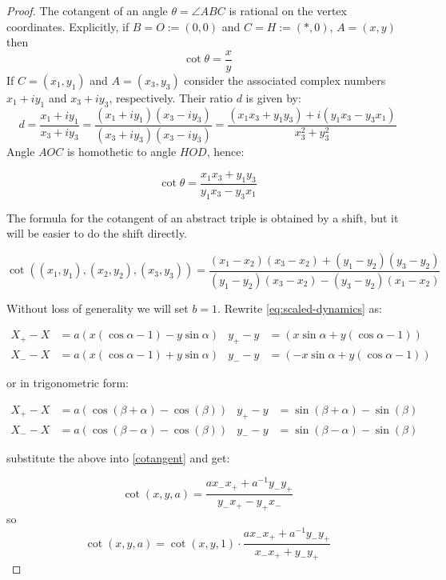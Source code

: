 \begin{proof}
The cotangent of an angle $\theta=\angle{ABC}$ is rational on the vertex coordinates. Explicitly, if $B=O:=(0,0)$ and $C=H:=(*,0)$, $A=(x,y)$ then
\[ \cot\theta = \frac{x}{y} \]
If $C=(x_1,y_1)$ and $A=(x_3,y_3)$ consider the associated complex numbers $x_1 + i y_1$ and $x_3 + i y_3$, respectively. Their ratio $d$ is given by:
\[ d 
 = \frac{x_1 + i y_1}{x_3 + i y_3} 
 = \frac{(x_1 + i y_1)(x_3 - i y_3)}{(x_3 + i y_3)(x_3 - i y_3)} 
 = \frac{(x_1 x_3 + y_1 y_3) + i (y_1 x_3 - y_3 x_1)}{x_3^2 + y_3^2}
\]
Angle $AOC$ is homothetic to angle $HOD$, hence:

\begin{equation} \label{cotangent}
\cot\theta = \frac{x_1 x_3 + y_1 y_3}{y_1 x_3 - y_3 x_1} 
\end{equation}

The formula for the cotangent of an abstract triple is obtained by a shift, but it will be easier to do the shift directly.

\begin{equation*} 
\cot((x_1,y_1),(x_2,y_2),(x_3,y_3)) = 
\frac{(x_1-x_2) (x_3-x_2) + (y_1-y_2) (y_3-y_2)}{(y_1-y_2) (x_3-x_2) - (y_3-y_2) (x_1-x_2)}
\end{equation*}

Without loss of generality we will set $b=1$. Rewrite \cref{eq:scaled-dynamics} as: 

\begin{align*}
X_+ - X &= a (x (\cos \alpha - 1) - y \sin \alpha)& y_+ - y &= ( x \sin \alpha + y (\cos \alpha - 1))  \\
X_- - X &= a (x (\cos \alpha - 1) + y \sin \alpha) & y_- - y &= (-x \sin \alpha + y (\cos \alpha - 1))  
\end{align*}

\noindent or in trigonometric form:

\begin{align*}
X_+ - X &= a (\cos(\beta+\alpha)-\cos(\beta))    &     y_+ - y &= \sin(\beta+\alpha)-\sin(\beta)  \\
X_- - X &= a (\cos(\beta-\alpha)-\cos(\beta))    &     y_- - y &= \sin(\beta-\alpha)-\sin(\beta)  
\end{align*}

\noindent substitute the above into 
\cref{cotangent} and get:

\begin{equation*} \label{cot-a}
\cot(x,y,a) = \frac{a x_- x_+ + a^{-1} y_- y_+}{y_- x_+ - y_+ x_-}
\end{equation*}
so
\begin{equation*}
\cot(x,y,a) = \cot(x,y,1) \cdot \frac{a x_- x_+ + a^{-1} y_- y_+}{x_- x_+ + y_- y_+}
\end{equation*}


\end{proof}
